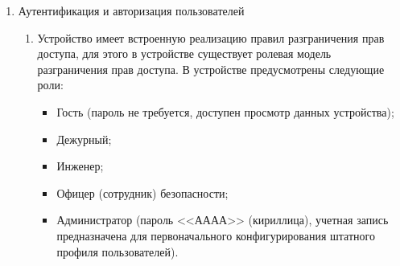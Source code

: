 \begin{enumerate}
\begin{enumerate}
\item
Система самодиагностики фиксирует критические неисправности (<<Неисправность>>) и некритические ошибки (<<Ошибка>>). По факту выхода из режимов критической неисправности и предупредительной сигнализации производится запись в журнале событий. Подробное описание системы самодиагностики приводится в документации ЮТКБ.656122.609 РЭ <<Устройство защиты и автоматики серии <<ЮНИТ-М300>>. Руководство по эксплуатации общее>>.

\item
В случае появления критической неисправности активируется внутренний сигнал <<Критическая неисправность>>, производится запись в журнал событий, замыкаются контакты реле IRF, прекращается работа алгоритмов основных функций в составе устройства, это состояние устройства сигнализируется свечением светодиода <<Неисправность>> и отсутствием свечения светодиода <<Готовность>>. Для выхода из режима критической неисправности требуется перезапуск устройства.

\item
В случае появления некритической ошибки активируется внутренний сигнал <<Некритическая ошибка>>, производится запись в журнал событий, алгоритмы основных функций в составе устройства продолжают выполняться, это состояние устройства сигнализируется свечением светодиода <<Неисправность>> и отсутствием свечения светодиода <<Готовность>>. Устройство может выйти из режима предупредительной сигнализации без активных действий со стороны пользователя по факту пропадания критериев режима.

\end{enumerate}

\item Аутентификация и авторизация пользователей
\begin{enumerate}

\item Устройство имеет встроенную реализацию правил разграничения прав доступа, для этого в устройстве существует ролевая модель разграничения прав доступа.
В устройстве предусмотрены следующие роли:
\begin{itemize}
\item Гость (пароль не требуется, доступен просмотр данных устройства);
\item Дежурный;
\item Инженер;
\item Офицер (сотрудник) безопасности;
\item Администратор (пароль <<АААА>> (кириллица), учетная запись предназначена для первоначального конфигурирования штатного профиля пользователей).
\end{itemize}


\end{enumerate}
\end{enumerate}
